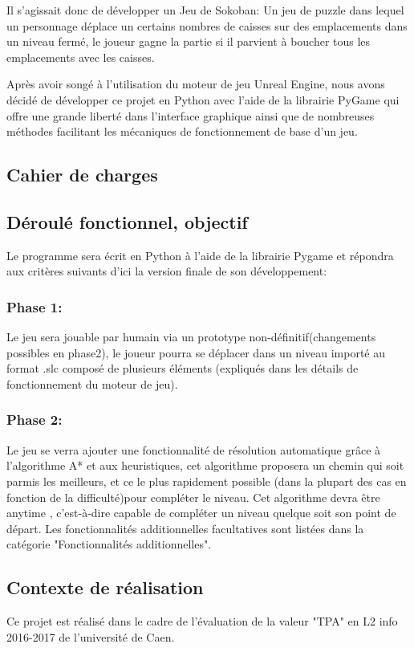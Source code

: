 \documentclass{article}
\begin{document}
	Il s'agissait donc de développer un Jeu de Sokoban: Un jeu de puzzle dans lequel un personnage déplace un certains nombres de caisses sur des emplacements dans un niveau fermé, le joueur gagne la partie si il parvient à boucher tous les emplacements avec les caisses.
	
	Après avoir songé à l'utilisation du moteur de jeu Unreal Engine, nous avons décidé de développer ce projet en Python avec l'aide de la librairie PyGame qui offre une grande liberté dans l'interface graphique ainsi que de nombreuses méthodes facilitant les mécaniques de fonctionnement de base d'un jeu. 
	\newpage
	\begin{center}
	\section{Cahier de charges}
	\end{center}
	\vspace{1cm}
		\subsection{Déroulé fonctionnel, objectif}
		Le programme sera écrit en Python à l’aide de la librairie Pygame et répondra aux critères suivants d’ici la version finale de son développement:
			\subsubsection{Phase 1:}
			Le jeu sera jouable par humain via un prototype non-définitif(changements possibles en phase2), le joueur pourra se déplacer dans un niveau importé au format .slc composé de plusieurs éléments (expliqués dans les détails de fonctionnement du moteur de jeu).
			\subsubsection{Phase 2:}
			Le jeu se verra ajouter une fonctionnalité de résolution automatique grâce à l’algorithme A* et aux heuristiques, cet algorithme proposera un chemin qui soit parmis les meilleurs, et ce le plus rapidement possible (dans la plupart des cas en fonction de la difficulté)pour compléter le niveau. Cet algorithme devra être anytime , c'est-à-dire capable de compléter un niveau quelque soit son point de départ.
Les fonctionnalités additionnelles facultatives sont listées dans la catégorie
"Fonctionnalités additionnelles".
		\subsection{Contexte de réalisation}
		Ce projet est réalisé dans le cadre de l’évaluation de la valeur "TPA" en L2 info 2016-2017 de l’université de Caen.
\end{document}
